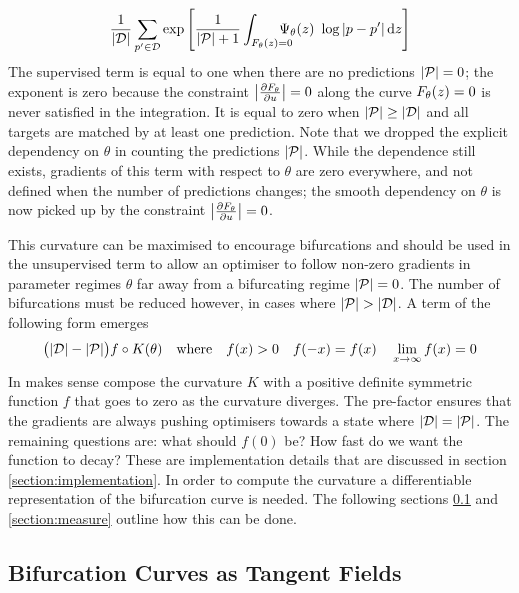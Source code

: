 \begin{align}
    \frac{1}{|\targets|}\sum_{p'\in\targets}
    \exp\left[
        \frac{1}{|\predictions|+1}
            \int_{\rates(z)=0}\!\!\!\!\!\!\!\!\!\!\!\!\!\quad\measure(z)\,\,\log|p-p'|
        \,\mathrm{d}z
    \right]
    \label{eq:supervised-term}
\end{align}
The supervised term is equal to one when there are no predictions $|\mathcal{P}|=0$; the exponent is zero because the constraint $\left| \frac{\partial F_{\theta}}{\partial u} \right|=0$ along the curve $F_{\theta}(z)=0$ is never satisfied in the integration. It is equal to zero when $|\mathcal{P}|\geq|\mathcal{D}|$ and all targets are matched by at least one prediction. Note that we dropped the explicit dependency on $\theta$ in counting the predictions $|\mathcal{P}|$. While the dependence still exists, gradients of this term with respect to $\theta$ are zero everywhere, and not defined when the number of predictions changes; the smooth dependency on $\theta$ is now picked up by the constraint $\left| \frac{\partial F_{\theta}}{\partial u} \right|=0$.

This curvature can be maximised to encourage bifurcations and should be used in the unsupervised term to allow an optimiser to follow non-zero gradients in parameter regimes $\theta$ far away from a bifurcating regime $|\mathcal{P}|=0$. The number of bifurcations must be reduced however, in cases where $|\predictions|>|\targets|$. A term of the following form emerges
\begin{align}
    \big(|\mathcal{D}|-|\mathcal{P}|\big)f \circ K(\theta)
    \quad\mathrm{where}\quad f(x)> 0 \quad f(-x)=f(x)\quad\lim_{x\rightarrow\infty}f(x)=0
\end{align}
In makes sense compose the curvature $K$ with a positive definite symmetric function $f$ that goes to zero as the curvature diverges. The pre-factor ensures that the gradients are always pushing optimisers towards a state where $|\mathcal{D}|=|\mathcal{P}|$. The remaining questions are: what should $f(0)$ be? How fast do we want the function to decay? These are implementation details that are discussed in section \ref{section:implementation}. In order to compute the curvature a differentiable representation of the bifurcation curve is needed. The following sections \ref{section:tangent-fields} and \ref{section:measure} outline how this can be done.

\subsection{Bifurcation Curves as Tangent Fields}
\label{section:tangent-fields}

